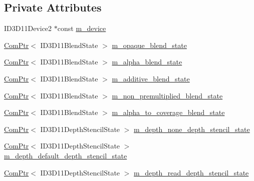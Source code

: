 \subsection*{Private Attributes}
\begin{DoxyCompactItemize}
\item 
I\+D3\+D11\+Device2 $\ast$const \hyperlink{structmage_1_1_rendering_state_cache_ad1846bcede5c3e6c8ce631b504b45cdf}{m\+\_\+device}
\item 
\hyperlink{namespacemage_ae74f374780900893caa5555d1031fd79}{Com\+Ptr}$<$ I\+D3\+D11\+Blend\+State $>$ \hyperlink{structmage_1_1_rendering_state_cache_ac655dae04386c2998677dff61704c975}{m\+\_\+opaque\+\_\+blend\+\_\+state}
\item 
\hyperlink{namespacemage_ae74f374780900893caa5555d1031fd79}{Com\+Ptr}$<$ I\+D3\+D11\+Blend\+State $>$ \hyperlink{structmage_1_1_rendering_state_cache_a4eda3c0aeeaca45e4e07358267bb8ae6}{m\+\_\+alpha\+\_\+blend\+\_\+state}
\item 
\hyperlink{namespacemage_ae74f374780900893caa5555d1031fd79}{Com\+Ptr}$<$ I\+D3\+D11\+Blend\+State $>$ \hyperlink{structmage_1_1_rendering_state_cache_ae29d186475c245d3eb5701005631c655}{m\+\_\+additive\+\_\+blend\+\_\+state}
\item 
\hyperlink{namespacemage_ae74f374780900893caa5555d1031fd79}{Com\+Ptr}$<$ I\+D3\+D11\+Blend\+State $>$ \hyperlink{structmage_1_1_rendering_state_cache_adaf1dd35ebb8e0ad9f2135ad0efee67a}{m\+\_\+non\+\_\+premultiplied\+\_\+blend\+\_\+state}
\item 
\hyperlink{namespacemage_ae74f374780900893caa5555d1031fd79}{Com\+Ptr}$<$ I\+D3\+D11\+Blend\+State $>$ \hyperlink{structmage_1_1_rendering_state_cache_a29e4108e7ec1c7583fc640ddf6fb2d13}{m\+\_\+alpha\+\_\+to\+\_\+coverage\+\_\+blend\+\_\+state}
\item 
\hyperlink{namespacemage_ae74f374780900893caa5555d1031fd79}{Com\+Ptr}$<$ I\+D3\+D11\+Depth\+Stencil\+State $>$ \hyperlink{structmage_1_1_rendering_state_cache_a2dfd8ceaab6604f77bda85900d0ebd0a}{m\+\_\+depth\+\_\+none\+\_\+depth\+\_\+stencil\+\_\+state}
\item 
\hyperlink{namespacemage_ae74f374780900893caa5555d1031fd79}{Com\+Ptr}$<$ I\+D3\+D11\+Depth\+Stencil\+State $>$ \hyperlink{structmage_1_1_rendering_state_cache_ad7f220ca4bc92d814e3e9044b0edf7e2}{m\+\_\+depth\+\_\+default\+\_\+depth\+\_\+stencil\+\_\+state}
\item 
\hyperlink{namespacemage_ae74f374780900893caa5555d1031fd79}{Com\+Ptr}$<$ I\+D3\+D11\+Depth\+Stencil\+State $>$ \hyperlink{structmage_1_1_rendering_state_cache_af58f7cc04ca479493902eca2b4f349bc}{m\+\_\+depth\+\_\+read\+\_\+depth\+\_\+stencil\+\_\+state}

\end{DoxyCompactItemize}
